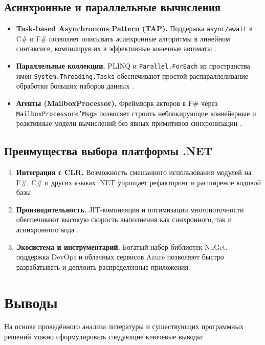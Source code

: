 \subsection{Асинхронные и параллельные вычисления}
\begin{itemize}
  \item \textbf{Task-based Asynchronous Pattern (TAP).} Поддержка \texttt{async/await} в C\# и F\# позволяет описывать асинхронные алгоритмы в линейном синтаксисе, компилируя их в эффективные конечные автоматы \cite{Richter2013}.
  \item \textbf{Параллельные коллекции.} PLINQ и \texttt{Parallel.ForEach} из пространства имён \texttt{System.Threading.Tasks} обеспечивают простой распараллеливание обработки больших наборов данных \cite{Duffy2008}.
  \item \textbf{Агенты (MailboxProcessor).} Фреймворк акторов в F\# через \texttt{MailboxProcessor<'Msg>} позволяет строить неблокирующие конвейерные и реактивные модели вычислений без явных примитивов синхронизации \cite{Syme2015}.
\end{itemize}

\subsection{Преимущества выбора платформы .NET}
\begin{enumerate}
  \item \textbf{Интеграция с CLR.} Возможность смешанного использования модулей на F\#, C\# и других языках .NET упрощает рефакторинг и расширение кодовой базы \cite{Richter2013}.
  \item \textbf{Производительность.} JIT‑компиляция и оптимизации многопоточности обеспечивают высокую скорость выполнения как синхронного, так и асинхронного кода \cite{Richter2013,Duffy2008}.
  \item \textbf{Экосистема и инструментарий.} Богатый набор библиотек NuGet, поддержка DevOps и облачных сервисов Azure позволяют быстро разрабатывать и деплоить распределённые приложения.
\end{enumerate}

\section{Выводы}

На основе проведённого анализа литературы и существующих программных решений можно сформулировать следующие ключевые выводы:

